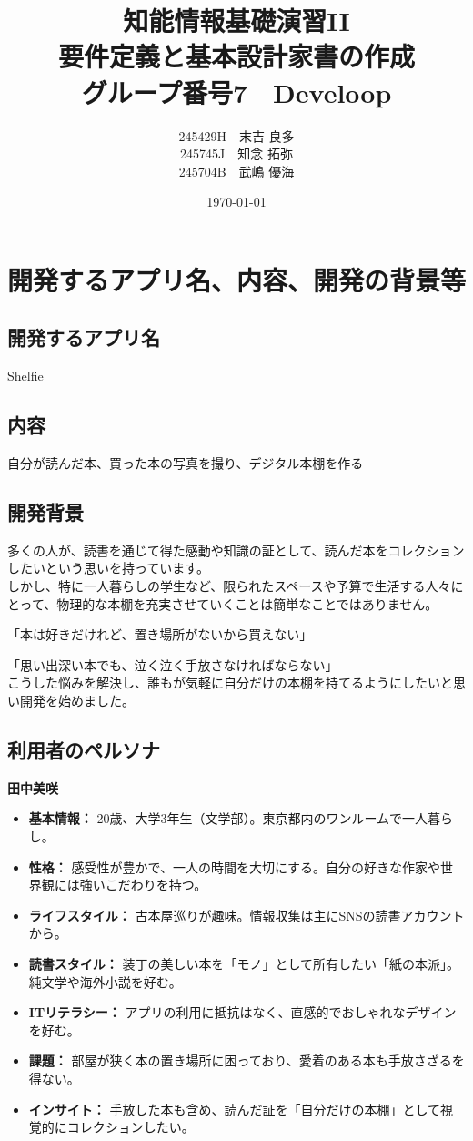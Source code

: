 \documentclass[a4paper, 11pt, titlepage]{jsarticle}
\title{知能情報基礎演習II \\ 要件定義と基本設計家書の作成 \\ グループ番号7　Develoop}
\author{245429H　末吉 良多 \\ 245745J　知念 拓弥 \\ 245704B　武嶋 優海}
\date{\today}
\begin{document}
\maketitle

\clearpage

\section{開発するアプリ名、内容、開発の背景等}%
\subsection{開発するアプリ名}
Shelfie
\subsection{内容}
自分が読んだ本、買った本の写真を撮り、デジタル本棚を作る
\subsection{開発背景}
多くの人が、読書を通じて得た感動や知識の証として、読んだ本をコレクションしたいという思いを持っています。\\
しかし、特に一人暮らしの学生など、限られたスペースや予算で生活する人々にとって、物理的な本棚を充実させていくことは簡単なことではありません。

「本は好きだけれど、置き場所がないから買えない」

「思い出深い本でも、泣く泣く手放さなければならない」\\
こうした悩みを解決し、誰もが気軽に自分だけの本棚を持てるようにしたいと思い開発を始めました。

\subsection{利用者のペルソナ}
\textbf{田中美咲}
\begin{itemize}
    \item \textbf{基本情報：} 20歳、大学3年生（文学部）。東京都内のワンルームで一人暮らし。
    \item \textbf{性格：} 感受性が豊かで、一人の時間を大切にする。自分の好きな作家や世界観には強いこだわりを持つ。
    \item \textbf{ライフスタイル：} 古本屋巡りが趣味。情報収集は主にSNSの読書アカウントから。
    \item \textbf{読書スタイル：} 装丁の美しい本を「モノ」として所有したい「紙の本派」。純文学や海外小説を好む。
    \item \textbf{ITリテラシー：} アプリの利用に抵抗はなく、直感的でおしゃれなデザインを好む。
    \item \textbf{課題：} 部屋が狭く本の置き場所に困っており、愛着のある本も手放さざるを得ない。
    \item \textbf{インサイト：} 手放した本も含め、読んだ証を「自分だけの本棚」として視覚的にコレクションしたい。
\end{itemize}
\end{document}
